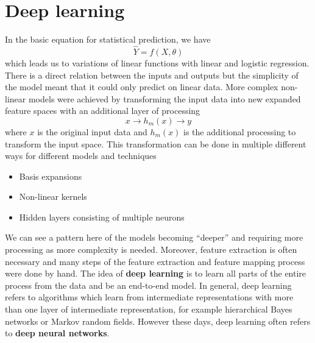 \documentclass[CS5104-Notes.tex]{subfiles}
\begin{document}
\section{Deep learning}
In the basic equation for statistical prediction, we have
\begin{equation}
  \hat{Y} = f(X, \theta)
\end{equation}
which leads us to variations of linear functions with linear and logistic regression. There is a direct relation between the inputs and outputs but the simplicity of the model meant that it could only predict on linear data. More complex non-linear models were achieved by transforming the input data into new expanded feature spaces with an additional layer of processing
\begin{equation}
x \rightarrow h_{m}(x) \rightarrow y
\end{equation}
where $x$ is the original input data and $h_{m}(x)$ is the additional processing to transform the input space. This transformation can be done in multiple different ways for different models and techniques
\begin{itemize}
\item Basis expansions
\item Non-linear kernels
\item Hidden layers consisting of multiple neurons
\end{itemize}
We can see a pattern here of the models becoming ``deeper'' and requiring more processing as more complexity is needed. Moreover, feature extraction is often necessary and many steps of the feature extraction and feature mapping process were done by hand. The idea of \textbf{deep learning} is to learn all parts of the entire process from the data and be an end-to-end model.
\n
In general, deep learning refers to algorithms which learn from intermediate representations with more than one layer of intermediate representation, for example hierarchical Bayes networks or Markov random fields. However these days, deep learning often refers to \textbf{deep neural networks}.
\end{document}
